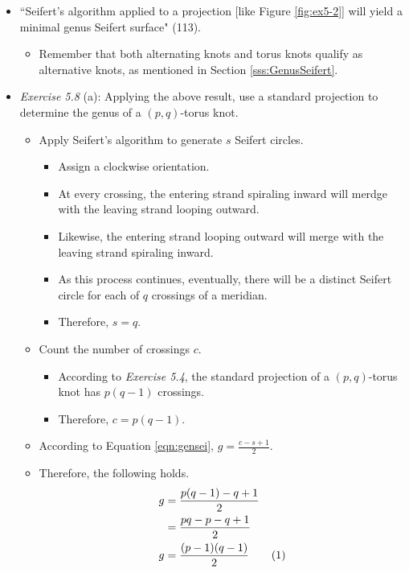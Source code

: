 \documentclass[titlepage]{article}
\numberwithin{figure}{section}
\numberwithin{table}{section}
\numberwithin{equation}{section}
\newcommand{\dq}[2]{``#1" (#2).}
\begin{document}
\begin{itemize}
    \item \dq{Seifert's algorithm applied to a projection [like Figure \ref{fig:ex5-2}] will yield a minimal genus Seifert surface}{113}
    \begin{itemize}
        \item Remember that both alternating knots and torus knots qualify as alternative knots, as mentioned in Section \ref{sss:GenusSeifert}.
    \end{itemize}
    \item \emph{Exercise 5.8} (a): Applying the above result, use a standard projection to determine the genus of a $(p,q)$-torus knot.
    \begin{itemize}
        \item Apply Seifert's algorithm to generate $s$ Seifert circles.
        \begin{itemize}
            \item Assign a clockwise orientation.
            \item At every crossing, the entering strand spiraling inward will merdge with the leaving strand looping outward.
            \item Likewise, the entering strand looping outward will merge with the leaving strand spiraling inward.
            \item As this process continues, eventually, there will be a distinct Seifert circle for each of $q$ crossings of a meridian.
            \item Therefore, $s=q$.
        \end{itemize}
        \item Count the number of crossings $c$.
        \begin{itemize}
            \item According to \emph{Exercise 5.4}, the standard projection of a $(p,q)$-torus knot has $p(q-1)$ crossings.
            \item Therefore, $c=p(q-1)$.
        \end{itemize}
        \item According to Equation \ref{eqn:gensei}, $g=\frac{c-s+1}{2}$.
        \item Therefore, the following holds.
        \begin{align*}
            g &=\frac{p(q-1)-q+1}{2}\\
            &=\frac{pq-p-q+1}{2}\\
            g &=\frac{(p-1)(q-1)}{2}\stepcounter{equation}\tag{\theequation}\label{eqn:genpq}
        \end{align*}

\end{itemize}
\end{itemize}
\end{document}
